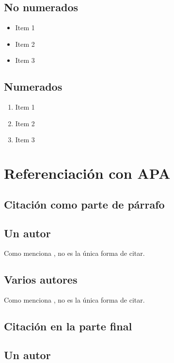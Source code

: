 \subsection{No numerados}
\begin{itemize}
    \item Item 1
    \item Item 2
    \item Item 3
\end{itemize}

\subsection{Numerados}
\begin{enumerate}
    \item Item 1
    \item Item 2
    \item Item 3
\end{enumerate}


\section{Referenciación con APA}

\subsection{Citación como parte de párrafo}

\subsection*{Un autor}

Como menciona , no es la única
forma de citar.\\

\subsection*{Varios autores}

Como menciona , no es la única
forma de citar.\\

\subsection{Citación en la parte final}

\subsection*{Un autor}

